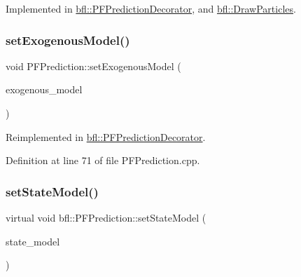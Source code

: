 Implemented in \mbox{\hyperlink{classbfl_1_1PFPredictionDecorator_af005f96b493e9ba72058613bbc7a8e43}{bfl\+::\+P\+F\+Prediction\+Decorator}}, and \mbox{\hyperlink{classbfl_1_1DrawParticles_a7a50d50c32b155fc22bc2edafe991dcd}{bfl\+::\+Draw\+Particles}}.

\mbox{\label{classbfl_1_1PFPrediction_ada843698204584e97d4ff6728c8e8264}} 
\subsubsection{\texorpdfstring{set\+Exogenous\+Model()}{setExogenousModel()}}
{\footnotesize\ttfamily void P\+F\+Prediction\+::set\+Exogenous\+Model (\begin{DoxyParamCaption}\item[{std\+::unique\+\_\+ptr$<$ \mbox{\hyperlink{classbfl_1_1ExogenousModel}{Exogenous\+Model}} $>$}]{exogenous\+\_\+model }\end{DoxyParamCaption})\hspace{0.3cm}{\ttfamily [virtual]}}



Reimplemented in \mbox{\hyperlink{classbfl_1_1PFPredictionDecorator_a3c38ae386456ecd0fd1b609b381395ec}{bfl\+::\+P\+F\+Prediction\+Decorator}}.



Definition at line 71 of file P\+F\+Prediction.\+cpp.

\mbox{\label{classbfl_1_1PFPrediction_ac39683650d7f89c59f1426dd7743354e}} 
\subsubsection{\texorpdfstring{set\+State\+Model()}{setStateModel()}}
{\footnotesize\ttfamily virtual void bfl\+::\+P\+F\+Prediction\+::set\+State\+Model (\begin{DoxyParamCaption}\item[{std\+::unique\+\_\+ptr$<$ \mbox{\hyperlink{classbfl_1_1StateModel}{State\+Model}} $>$}]{state\+\_\+model }\end{DoxyParamCaption})\hspace{0.3cm}{\ttfamily [pure virtual]}}



